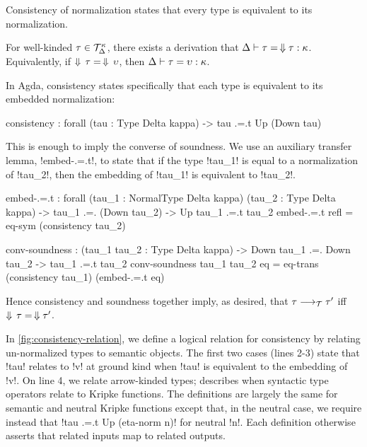 \documentclass[sigplan,10pt,anonymous,review]{acmart}\settopmatter{printfolios=true,printccs=false,printacmref=false}
\begin{document}
Consistency of normalization states that every type is equivalent to its normalization.

\ifthms
\begin{theorem}[Consistency]
For well-kinded $\tau \in {\mathcal T}_{\Delta}^{\kappa}$, there exists a derivation that $\Delta \vdash \tau = \,\Downarrow \tau : \kappa$. Equivalently, if $\Downarrow\, \tau =\, \Downarrow\, \upsilon$, then $\Delta \vdash \tau = \upsilon : \kappa$.
\end{theorem}\fi

In Agda, consistency states specifically that each type is equivalent to its embedded normalization:

\begin{agda}
consistency : forall (tau : Type Delta kappa) -> tau .=.t Up (Down tau)
\end{agda}

\Ni This is enough to imply the converse of soundness. We use an auxiliary transfer lemma, !embed-.=.t!, to state that if the type !tau_1! is equal to a normalization of !tau_2!, then the embedding of !tau_1! is equivalent to !tau_2!.

\begin{agda}
embed-.=.t : forall (tau_1 : NormalType Delta kappa) (tau_2 : Type Delta kappa) -> 
             tau_1 .=. (Down tau_2) -> Up tau_1 .=.t tau_2 
embed-.=.t refl = eq-sym (consistency tau_2)

conv-soundness : (tau_1 tau_2 : Type Delta kappa) -> 
                    Down tau_1 .=. Down tau_2 -> tau_1 .=.t tau_2
conv-soundness tau_1 tau_2 eq = 
  eq-trans (consistency tau_1) (embed-.=.t eq)                 
\end{agda}

\Ni Hence consistency and soundness together imply, as desired, that $\tau \longrightarrow_{\mathcal T} \tau'$ iff $\Downarrow\, \tau =\, \Downarrow \tau'$.

In \cref{fig:consistency-relation}, we define a logical relation for consistency by relating un-normalized types to semantic objects. The first two cases (lines 2-3) state that !tau! relates to !v! at ground kind when !tau! is equivalent to the embedding of !v!. On line 4, we relate arrow-kinded types;  describes when syntactic type operators relate to Kripke functions. The definitions are largely the same for semantic and neutral Kripke functions except that, in the neutral case, we require instead that !tau .=.t Up (eta-norm n)! for neutral !n!. Each definition otherwise asserts that related inputs map to related outputs.
\end{document}
